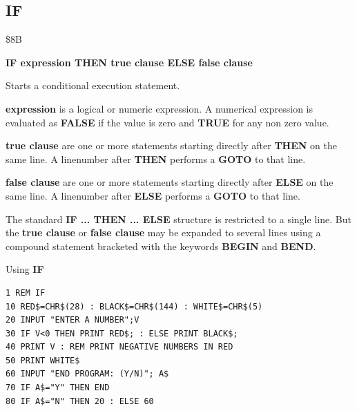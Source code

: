 \subsection{IF}
\begin{description}[leftmargin=2cm,style=nextline]
\item [Token:] \$8B
\item [Format:] {\bf IF expression THEN true clause ELSE false clause}
\item [Usage:] Starts a conditional execution
               statement.

               {\bf expression} is a logical or numeric expression.
               A numerical expression is evaluated as {\bf FALSE}
               if the value is zero and {\bf TRUE} for any non zero
               value.

               {\bf true clause} are one or more statements starting
               directly after {\bf THEN} on the same line.
               A linenumber after {\bf THEN} performs a
               {\bf GOTO} to that line.

               {\bf false clause} are one or more statements starting
               directly after {\bf ELSE} on the same line.
               A linenumber after {\bf ELSE} performs a
               {\bf GOTO} to that line.

\item [Remarks:]
               The standard {\bf IF ... THEN ... ELSE} structure
               is restricted to a single line. But the {\bf true clause}
               or {\bf false clause} may be expanded to several lines
               using a compound statement bracketed with the keywords
               {\bf BEGIN} and {\bf BEND}.
\item [Example:]
                Using {\bf IF}
\begin{tcolorbox}[colback=black,coltext=white]
\verbatimfont{\codefont}
\begin{verbatim}
1 REM IF
10 RED$=CHR$(28) : BLACK$=CHR$(144) : WHITE$=CHR$(5)
20 INPUT "ENTER A NUMBER";V
30 IF V<0 THEN PRINT RED$; : ELSE PRINT BLACK$;
40 PRINT V : REM PRINT NEGATIVE NUMBERS IN RED
50 PRINT WHITE$
60 INPUT "END PROGRAM: (Y/N)"; A$
70 IF A$="Y" THEN END
80 IF A$="N" THEN 20 : ELSE 60
\end{verbatim}
\end{tcolorbox}
\end{description}


